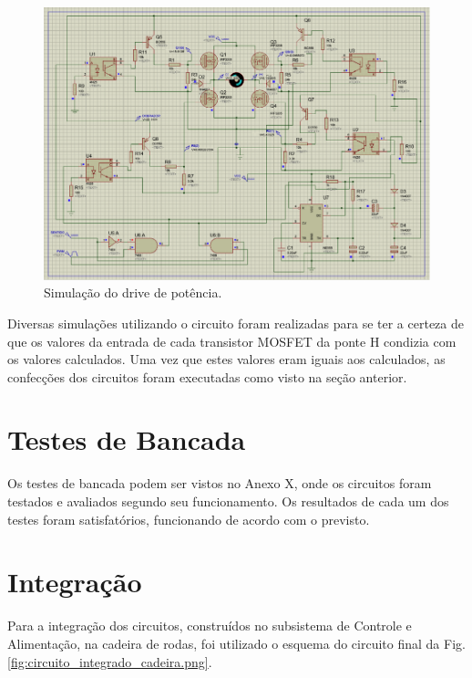\begin{figure}
    \begin{center}
        \includegraphics{figuras/simulacao.png}
    \end{center}
    \caption{Simulação do drive de potência.}
    \label{fig:simulacao.png}
\end{figure}

Diversas simulações utilizando o circuito foram realizadas para se ter a certeza de que os valores da entrada de cada transistor MOSFET da ponte H condizia com os valores calculados. Uma vez que estes valores eram iguais aos calculados, as confecções dos circuitos foram executadas como visto na seção anterior.

\section{Testes de Bancada}

Os testes de bancada podem ser vistos no Anexo X, onde os circuitos foram testados e avaliados segundo seu funcionamento. Os resultados de cada um dos testes foram satisfatórios, funcionando de acordo com o previsto.

\section{Integração}

Para a integração dos circuitos, construídos no subsistema de Controle e Alimentação, na cadeira de rodas, foi utilizado o esquema do circuito final da Fig. \ref{fig:circuito_integrado_cadeira.png}.

